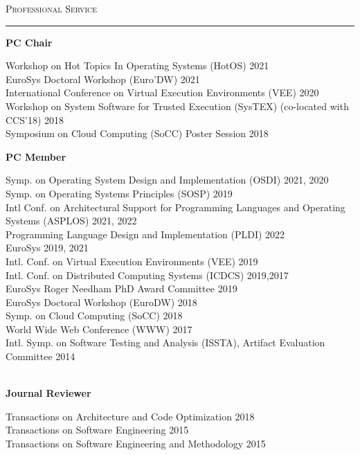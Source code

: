 \documentclass[10pt]{article}
\newcommand{\mysec}[1]{\vspace{2em}\textsc{\large #1}\vspace{1mm}\hrule\vspace{2mm}}
\newcommand{\mysub}[3]{\textbf{#1} {#2} \hfill {\em #3}}
\newcommand{\myssub}[1]{\hspace*{2mm}\parbox{163mm}{#1}\vspace*{2mm}}
\begin{document}
\mysec{Professional Service}


\mysub{PC Chair}{}{}\\
\myssub{\vspace{2mm}
  Workshop on Hot Topics In Operating Systems (HotOS) \hfill 2021 \\
  EuroSys Doctoral Workshop (Euro'DW) \hfill 2021 \\
  International Conference on Virtual Execution Environments (VEE) \hfill 2020 \\
  Workshop on System Software for Trusted Execution (SysTEX) (co-located with CCS'18) \hfill 2018 \\
  Symposium on Cloud Computing (SoCC) Poster Session \hfill 2018 \\
}
%

\newpage

\mysub{PC Member}{}{}\\
\myssub{\vspace{2mm}
  Symp. on Operating System Design and Implementation (OSDI) \hfill 2021, 2020 \\
  Symp. on Operating Systems Principles (SOSP) \hfill 2019 \\
  Intl Conf. on Architectural Support for Programming Languages and Operating Systems (ASPLOS) \hfill 2021, 2022 \\
  Programming Language Design and Implementation (PLDI) \hfill 2022 \\
  EuroSys \hfill 2019, 2021 \\
  Intl. Conf. on Virtual Execution Environments (VEE) \hfill 2019 \\
  Intl. Conf. on Distributed Computing Systems (ICDCS) \hfill 2019,2017 \\
  EuroSys Roger Needham PhD Award Committee \hfill 2019 \\  
  EuroSys Doctoral Workshop (EuroDW) \hfill 2018 \\
  Symp. on Cloud Computing (SoCC) \hfill 2018 \\
  World Wide Web Conference (WWW) \hfill 2017 \\
  Intl. Symp. on Software Testing and Analysis (ISSTA), Artifact Evaluation Committee \hfill 2014 \\
}\\

\mysub{Journal Reviewer}{}{} \\
\myssub{\vspace{2mm}Transactions on Architecture and Code Optimization \hfill 2018\\
  Transactions on Software Engineering \hfill 2015 \\
  Transactions on Software Engineering and Methodology \hfill 2015} \\
\end{document}
